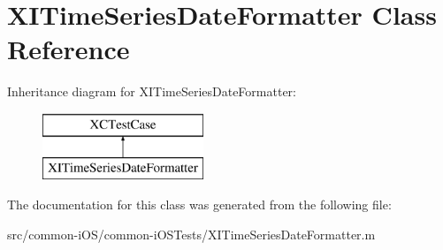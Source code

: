 \hypertarget{interface_x_i_time_series_date_formatter}{}\section{X\+I\+Time\+Series\+Date\+Formatter Class Reference}
\label{interface_x_i_time_series_date_formatter}
Inheritance diagram for X\+I\+Time\+Series\+Date\+Formatter\+:\begin{figure}[H]
\begin{center}
\leavevmode
\includegraphics[height=2.000000cm]{interface_x_i_time_series_date_formatter}
\end{center}
\end{figure}


The documentation for this class was generated from the following file\+:\begin{DoxyCompactItemize}
\item 
src/common-\/i\+O\+S/common-\/i\+O\+S\+Tests/X\+I\+Time\+Series\+Date\+Formatter.\+m\end{DoxyCompactItemize}
